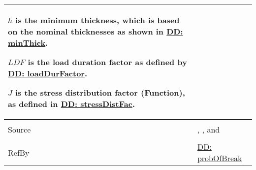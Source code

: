 \documentclass[12pt]{article}
\begin{document}
\begin{minipage}{\textwidth}
\begin{tabular}{>{\raggedright}p{}>{\raggedright\arraybackslash}p{}}
        $h$ is the minimum thickness, which is based on the nominal thicknesses as shown in \hyperref[DD:minThick]{DD: minThick}.
        
        $LDF$ is the load duration factor as defined by \hyperref[DD:loadDurFactor]{DD: loadDurFactor}.
        
        $J$ is the stress distribution factor (Function), as defined in \hyperref[DD:stressDistFac]{DD: stressDistFac}.
        
\\ \midrule \\
Source & \cite{astm2009}, \cite[(Eqs. 4-5)]{beasonEtAl1998}, and \cite[(Eq. 14)]{campidelli}
         
\\ \midrule \\
RefBy & \hyperref[DD:probOfBreak]{DD: probOfBreak}
        
\\ \bottomrule
\end{tabular}
\end{minipage}
\end{document}

